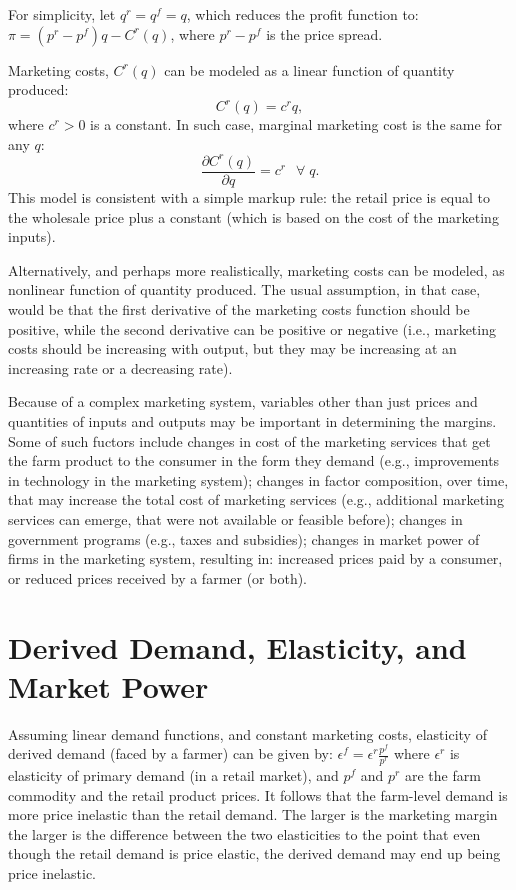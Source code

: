 \documentclass[
]{book}
\begin{document}
For simplicity, let \(q^r=q^f=q\), which reduces the profit function to: \(\pi = (p^r - p^f) q - C^r(q)\), where \(p^r - p^f\) is the price spread.

Marketing costs, \(C^r(q)\) can be modeled as a linear function of quantity produced: \[C^r(q) = c^r q,\] where \(c^r > 0\) is a constant. In such case, marginal marketing cost is the same for any \(q\): \[\frac{\partial C^r(q)}{\partial q} = c^r\;~~\forall\;q.\] This model is consistent with a simple markup rule: the retail price is equal to the wholesale price plus a constant (which is based on the cost of the marketing inputs).

Alternatively, and perhaps more realistically, marketing costs can be modeled, as nonlinear function of quantity produced. The usual assumption, in that case, would be that the first derivative of the marketing costs function should be positive, while the second derivative can be positive or negative (i.e., marketing costs should be increasing with output, but they may be increasing at an increasing rate or a decreasing rate).

Because of a complex marketing system, variables other than just prices and quantities of inputs and outputs may be important in determining the margins. Some of such fuctors include changes in cost of the marketing services that get the farm product to the consumer in the form they demand (e.g., improvements in technology in the marketing system); changes in factor composition, over time, that may increase the total cost of marketing services (e.g., additional marketing services can emerge, that were not available or feasible before); changes in government programs (e.g., taxes and subsidies); changes in market power of firms in the marketing system, resulting in: increased prices paid by a consumer, or reduced prices received by a farmer (or both).

\hypertarget{derived-demand-elasticity-and-market-power}{%
\section{Derived Demand, Elasticity, and Market Power}\label{derived-demand-elasticity-and-market-power}}

Assuming linear demand functions, and constant marketing costs, elasticity of derived demand (faced by a farmer) can be given by: \(\epsilon^f = \epsilon^r\frac{p^f}{p^r}\) where \(\epsilon^r\) is elasticity of primary demand (in a retail market), and \(p^f\) and \(p^r\) are the farm commodity and the retail product prices. It follows that the farm-level demand is more price inelastic than the retail demand. The larger is the marketing margin the larger is the difference between the two elasticities to the point that even though the retail demand is price elastic, the derived demand may end up being price inelastic.
\end{document}
